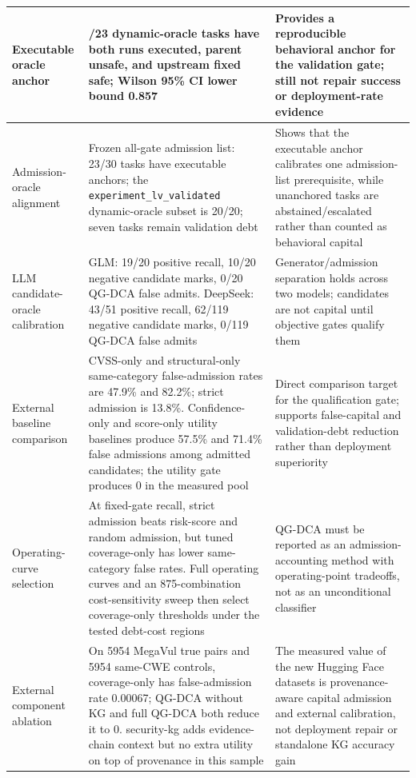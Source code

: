 ﻿\documentclass[lettersize,journal]{IEEEtran}
\begin{document}
\begin{table}[!t]
{\begin{tabular}{|>{\raggedright\arraybackslash}p{1.35in}|>{\raggedright\arraybackslash}p{2.25in}|>{\raggedright\arraybackslash}p{2.7in}|}
\hline
Executable oracle anchor & 23/23 dynamic-oracle tasks have both runs executed, parent unsafe, and upstream fixed safe; Wilson 95\% CI lower bound 0.857 & Provides a reproducible behavioral anchor for the validation gate; still not repair success or deployment-rate evidence \\
\hline
Admission-oracle alignment & Frozen all-gate admission list: 23/30 tasks have executable anchors; the \texttt{experiment\_lv\_validated} dynamic-oracle subset is 20/20; seven tasks remain validation debt & Shows that the executable anchor calibrates one admission-list prerequisite, while unanchored tasks are abstained/escalated rather than counted as behavioral capital \\
\hline
LLM candidate-oracle calibration & GLM: 19/20 positive recall, 10/20 negative candidate marks, 0/20 QG-DCA false admits. DeepSeek: 43/51 positive recall, 62/119 negative candidate marks, 0/119 QG-DCA false admits & Generator/admission separation holds across two models; candidates are not capital until objective gates qualify them \\
\hline
External baseline comparison & CVSS-only and structural-only same-category false-admission rates are 47.9\% and 82.2\%; strict admission is 13.8\%. Confidence-only and score-only utility baselines produce 57.5\% and 71.4\% false admissions among admitted candidates; the utility gate produces 0 in the measured pool & Direct comparison target for the qualification gate; supports false-capital and validation-debt reduction rather than deployment superiority \\
\hline
Operating-curve selection & At fixed-gate recall, strict admission beats risk-score and random admission, but tuned coverage-only has lower same-category false rates. Full operating curves and an 875-combination cost-sensitivity sweep then select coverage-only thresholds under the tested debt-cost regions & QG-DCA must be reported as an admission-accounting method with operating-point tradeoffs, not as an unconditional classifier \\
\hline
External component ablation & On 5954 MegaVul true pairs and 5954 same-CWE controls, coverage-only has false-admission rate 0.00067; QG-DCA without KG and full QG-DCA both reduce it to 0. security-kg adds evidence-chain context but no extra utility on top of provenance in this sample & The measured value of the new Hugging Face datasets is provenance-aware capital admission and external calibration, not deployment repair or standalone KG accuracy gain \\

\end{tabular}}
\end{table}
\end{document}
